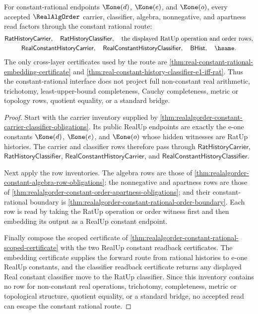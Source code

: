 \begin{theorem}
\label{thm:realalgorder-constant-rational-audit-exactness}
For constant-rational endpoints $\Eone(d)$, $\Eone(e)$, and $\Eone(o)$, every
accepted $\RealAlgOrder$ carrier, classifier, algebra, nonnegative, and
apartness read factors through the constant rational route:
$$
\begin{gathered}
\mathsf{RatHistoryCarrier},\quad
\mathsf{RatHistoryClassifier},\quad
\text{the displayed RatUp operation and order rows},\\
\mathsf{RealConstantHistoryCarrier},\quad
\mathsf{RealConstantHistoryClassifier},\quad
\mathsf{BHist},\quad
\hsame .
\end{gathered}
$$
The only cross-layer certificates used by the route are
\autoref{thm:real-constant-rational-embedding-certificate} and
\autoref{thm:real-constant-history-classifier-e1-iff-rat}. Thus the
constant-rational interface does not project full non-constant real
arithmetic, trichotomy, least-upper-bound completeness, Cauchy completeness,
metric or topology rows, quotient equality, or a standard bridge.
\end{theorem}
\begin{proof}
Start with the carrier inventory supplied by
\autoref{thm:realalgorder-constant-carrier-classifier-obligations}. Its public
RealUp endpoints are exactly the e-one constants $\Eone(d)$, $\Eone(e)$, and
$\Eone(o)$ whose hidden witnesses are RatUp histories. The carrier and
classifier rows therefore pass through $\mathsf{RatHistoryCarrier}$,
$\mathsf{RatHistoryClassifier}$, $\mathsf{RealConstantHistoryCarrier}$, and
$\mathsf{RealConstantHistoryClassifier}$.

Next apply the row inventories. The algebra rows are those of
\autoref{thm:realalgorder-constant-algebra-row-obligations}; the nonnegative
and apartness rows are those of
\autoref{thm:realalgorder-constant-order-apartness-obligations}; and their
constant-rational boundary is
\autoref{thm:realalgorder-constant-rational-order-boundary}. Each row is read
by taking the RatUp operation or order witness first and then embedding its
output as a RealUp constant endpoint.

Finally compose the scoped certificate of
\autoref{thm:realalgorder-constant-rational-scoped-certificate} with the two
RealUp constant readback certificates. The embedding certificate supplies the
forward route from rational histories to e-one RealUp constants, and the
classifier readback certificate returns any displayed Real constant classifier
move to the RatUp classifier. Since this inventory contains no row for
non-constant real operations, trichotomy, completeness, metric or topological
structure, quotient equality, or a standard bridge, no accepted read can escape
the constant rational route.
\end{proof}

